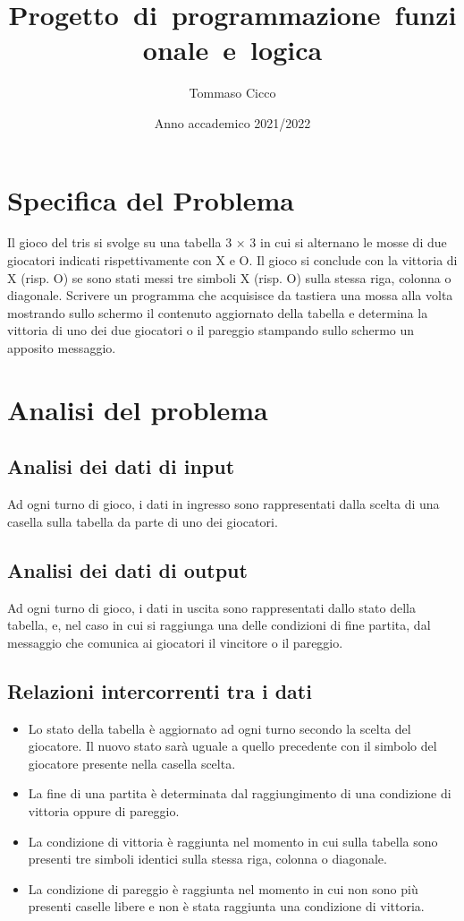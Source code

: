 \documentclass{article}
\title{Progetto~di~programmazione~funzionale~e~logica}
\author{Tommaso Cicco}
\date{\small Anno accademico 2021/2022}
\begin{document}
\maketitle
\newpage
\tableofcontents
\newpage
 
\section{Specifica del Problema}

Il gioco del tris si svolge su una tabella 3 × 3 in cui si alternano le mosse di due giocatori indicati rispettivamente con X e O. 
Il gioco si conclude con la vittoria di X (risp. O) se sono stati messi tre simboli X (risp. O) sulla stessa riga, colonna o diagonale. 
Scrivere un programma che acquisisce da tastiera una mossa alla volta mostrando sullo schermo il contenuto aggiornato della tabella 
e determina la vittoria di uno dei due giocatori o il pareggio stampando sullo schermo un apposito messaggio.
\newpage
\section{Analisi del problema}

\subsection{Analisi dei dati di input}

Ad ogni turno di gioco, i dati in ingresso sono rappresentati dalla scelta di una casella sulla tabella da parte di uno dei giocatori.
\subsection{Analisi dei dati di output}

Ad ogni turno di gioco, i dati in uscita sono rappresentati dallo stato della tabella, e, nel caso in cui si raggiunga una delle condizioni di fine partita, dal messaggio che comunica ai giocatori il vincitore o il pareggio.
\subsection{Relazioni intercorrenti tra i dati}

\begin{itemize}
    \item Lo stato della tabella è aggiornato ad ogni turno secondo la scelta del giocatore. Il nuovo stato sarà uguale a quello precedente con il simbolo del giocatore presente nella casella scelta.
    \item La fine di una partita è determinata dal raggiungimento di una condizione di vittoria oppure di pareggio.
    \item La condizione di vittoria è raggiunta nel momento in cui sulla tabella sono presenti tre simboli identici sulla stessa riga, colonna o diagonale.
    \item La condizione di pareggio è raggiunta nel momento in cui non sono più presenti caselle libere e non è stata raggiunta una condizione di vittoria.
\end{itemize}
\newpage
\end{document}

